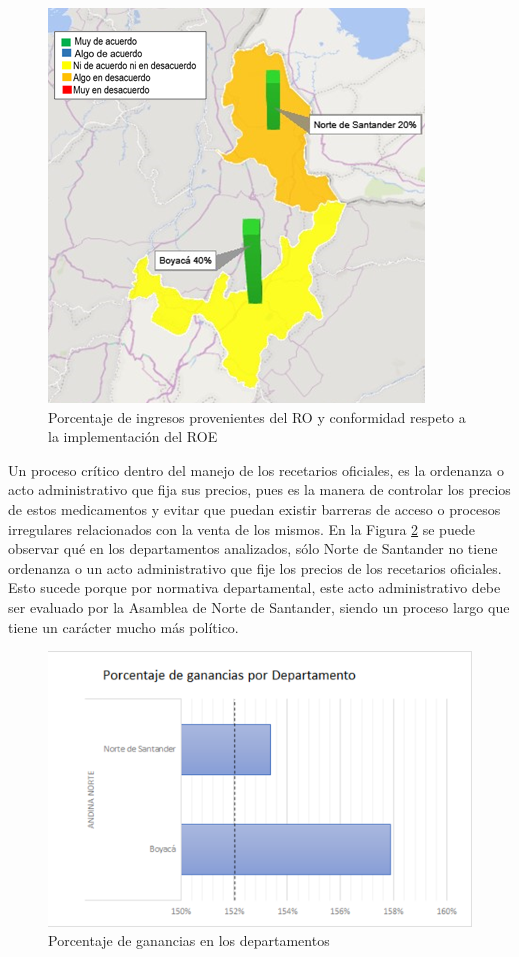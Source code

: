 \documentclass[
]{book}
\begin{document}
\begin{figure}
\includegraphics[width=0.85\linewidth]{figures/Imagen3} \caption{Porcentaje de ingresos provenientes del RO y conformidad respeto a la implementación del ROE}\label{fig:PorcIngresosProvenientesRO}
\end{figure}

Un proceso crítico dentro del manejo de los recetarios oficiales, es la ordenanza o acto administrativo que fija sus precios, pues es la manera de controlar los precios de estos medicamentos y evitar que puedan existir barreras de acceso o procesos irregulares relacionados con la venta de los mismos. En la Figura \ref{fig:PorcGananciasDepto} se puede observar qué en los departamentos analizados, sólo Norte de Santander no tiene ordenanza o un acto administrativo que fije los precios de los recetarios oficiales. Esto sucede porque por normativa departamental, este acto administrativo debe ser evaluado por la Asamblea de Norte de Santander, siendo un proceso largo que tiene un carácter mucho más político.

\begin{figure}
\includegraphics[width=0.85\linewidth]{figures/Imagen4} \caption{Porcentaje de ganancias en los departamentos}\label{fig:PorcGananciasDepto}
\end{figure}
\end{document}
